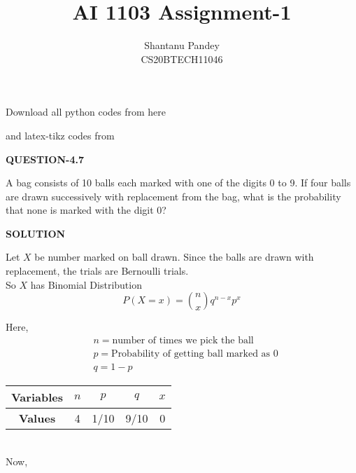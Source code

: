\documentclass[a4paper]{article}
\title{AI 1103 Assignment-1}
\author{Shantanu Pandey\\ CS20BTECH11046}
\date{}
\begin{document}
\maketitle
\noindent
Download all python codes from here

\begin{multicols*}{2}
\noindent
{}
    
\vspace{0.3cm}
and latex-tikz codes from  

\vspace{0.3cm}  
    
   
\vspace{0.5cm}
\textbf{QUESTION-4.7}
\vspace{0.5cm} 

A bag consists of 10 balls each marked with
one of the digits 0 to 9. If four balls are drawn
successively with replacement from the bag,
what is the probability that none is marked
with the digit 0?

\vspace{0.5cm}
\textbf{SOLUTION}
\vspace{0.5cm} 

\vspace{0.3cm}

Let $X$ be number marked on ball drawn.
Since the balls are drawn with replacement, the trials are Bernoulli trials.
\\
So $X$ has Binomial Distribution 
\begin{equation}
    P(X=x)=\binom{n}{x}q^{n-x}p^{x} 
\end{equation} 

Here,\\
\begin{align*}
& n = \text {number of times we pick the ball}  \\
& p= \text{Probability of getting ball marked as 0} \\
& q=1-p
\end{align*}

\begin{tabular}{|c|c|c|c|c|}
\hline
\textbf{Variables} & $n$ & $p$    & $q$    & $x$          \\ \hline
\textbf{Values}    & 4 & 1/10 & 9/10 & 0 \\ \hline
\end{tabular}
\\
Now,


\end{multicols*}
\end{document}
